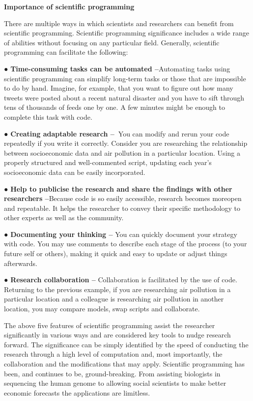 \documentclass[
]{book}
\begin{document}
\textbf{Importance of scientific programming}

There are multiple ways in which scientists and researchers can benefit from scientific programming. Scientific programming significance includes a wide range of abilities without focusing on any particular field. Generally, scientific programming can facilitate the following:

● \textbf{Time-consuming tasks can be automated --}Automating tasks using scientific programming can simplify long-term tasks or those that are impossible to do by hand. Imagine, for example, that you want to figure out how many tweets were posted about a recent natural disaster and you have to sift through tens of thousands of feeds one by one. A few minutes might be enough to complete this task with code.

● \textbf{Creating adaptable research --~}You can modify and rerun your code repeatedly if you write it correctly. Consider you are researching the relationship between socioeconomic data and air pollution in a particular location. Using a properly structured and well-commented script, updating each year's socioeconomic data can be easily incorporated.

● \textbf{Help to publicise the research and share the findings with other researchers --}Because code is so easily accessible, research becomes moreopen and repeatable. It helps the researcher to convey their specific methodology to other experts as well as the community.

● \textbf{Documenting your thinking --} You can quickly document your strategy with code. You may use comments to describe each stage of the process (to your future self or others), making it quick and easy to update or adjust things afterwards.

● \textbf{Research collaboration --} Collaboration is facilitated by the use of code. Returning to the previous example, if you are researching air pollution in a particular location and a colleague is researching air pollution in another location, you may compare models, swap scripts and collaborate.

The above five features of scientific programming assist the researcher significantly in various ways and are considered key tools to nudge research forward. The significance can be simply identified by the speed of conducting the research through a high level of computation and, most importantly, the collaboration and the modifications that may apply. Scientific programming has been, and continues to be, ground-breaking. From assisting biologists in sequencing the human genome to allowing social scientists to make better economic forecasts the applications are limitless.
\end{document}
